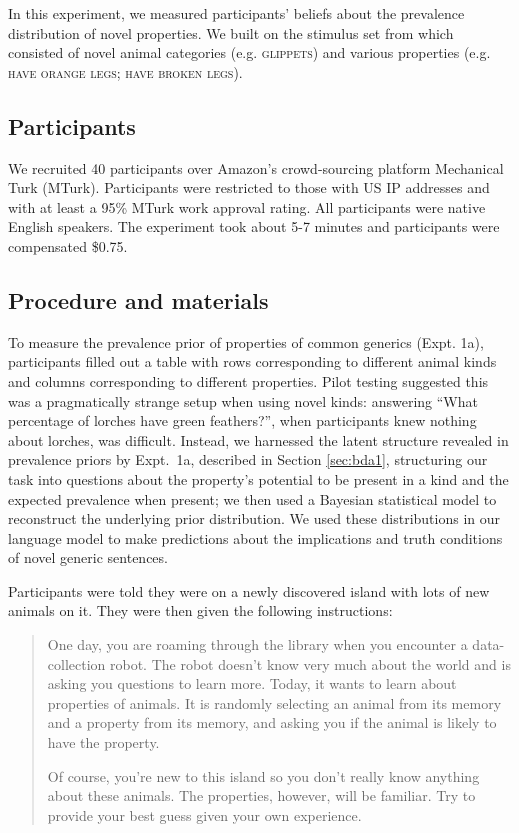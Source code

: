 \documentclass[10pt,letterpaper]{article}
\begin{document}
In this experiment, we measured participants' beliefs about the prevalence distribution of novel properties.
We built on the stimulus set from  which consisted of novel animal categories (e.g. \textsc{glippets}) and various properties (e.g. \textsc{have orange legs; have broken legs}).


\subsection{Participants}

We recruited 40 participants over Amazon's crowd-sourcing platform Mechanical Turk (MTurk).  
Participants were restricted to those with US IP addresses and with at least a 95\% MTurk work approval rating. 
All participants were native English speakers. 
The experiment took about 5-7 minutes and participants were compensated \$0.75.

\subsection{Procedure and materials}

To measure the prevalence prior of properties of common generics (Expt. 1a), participants filled out a table with rows corresponding to different animal kinds and columns corresponding to different properties. 
Pilot testing suggested this was a pragmatically strange setup when using novel kinds: answering ``What percentage of lorches have green feathers?'', when participants knew nothing about lorches, was difficult.
Instead, we harnessed the latent structure revealed in prevalence priors by Expt.~1a, described in Section \ref{sec:bda1}, structuring our task into questions about the property's potential to be present in a kind and the expected prevalence when present; we then used a Bayesian statistical model to reconstruct the underlying prior distribution. 
We used these distributions in our language model to make predictions about the implications and truth conditions of novel generic sentences.


Participants were told they were on a newly discovered island with lots of new animals on it. They were then given the following instructions:

\begin{quote}
One day, you are roaming through the library when you encounter a data-collection robot. The robot doesn't know very much about the world and is asking you questions to learn more. Today, it wants to learn about properties of animals. It is randomly selecting an animal from its memory and a property from its memory, and asking you if the animal is likely to have the property.

Of course, you're new to this island so you don't really know anything about these animals. The properties, however, will be familiar. Try to provide your best guess given your own experience.
\end{quote}
\end{document}
